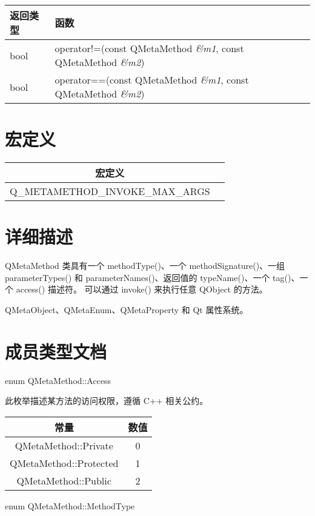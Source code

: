 \begin{tabular}{|l|l|}
\hline
返回类型 &	函数 \\ 
\hline
bool  &	operator!=(const QMetaMethod \emph{\&m1}, const QMetaMethod \emph{\&m2}) \\
\hline 
bool  &	operator==(const QMetaMethod \emph{\&m1}, const QMetaMethod \emph{\&m2})  \\
\hline
\end{tabular}

\section{宏定义}

\begin{tabular}{|c|c|}
	\hline
	宏定义 \\ 
	\hline
Q\_METAMETHOD\_INVOKE\_MAX\_ARGS \\ 
	\hline
	\end{tabular}

\section{详细描述}

QMetaMethod 类具有一个 methodType()、一个 methodSignature()、一组 parameterTypes() 和 parameterNames()、返回值的 typeName()、一个 tag()、一个 access() 描述符。
可以通过 invoke() 来执行任意 QObject 的方法。

\begin{seeAlso}
QMetaObject、QMetaEnum、QMetaProperty 和 Qt 属性系统。
\end{seeAlso}

\section{成员类型文档}

enum QMetaMethod::Access

此枚举描述某方法的访问权限，遵循 C++ 相关公约。


\begin{tabular}{|c|c|}
	\hline
	常量 	& 数值  \\
	\hline
	QMetaMethod::Private  &	0 \\ 
	\hline
	QMetaMethod::Protected &	1 \\ 
	\hline
	QMetaMethod::Public &	2 \\ 
	\hline
	\end{tabular}

enum QMetaMethod::MethodType	

